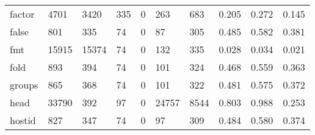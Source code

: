 \begin{longtable}{lp{1.3cm}p{1.3cm}p{1.3cm}p{1.3cm}p{1.3cm}p{1.3cm}p{1.3cm}p{1.3cm}p{1.3cm}}
factor    &                   4701 &                               3420 &                               335 &                                0 &                               263 &                             683 &                                   0.205 &                                  0.272 &                                0.145 \\
false     &                    801 &                                335 &                                74 &                                0 &                                87 &                             305 &                                   0.485 &                                  0.582 &                                0.381 \\
fmt       &                  15915 &                              15374 &                                74 &                                0 &                               132 &                             335 &                                   0.028 &                                  0.034 &                                0.021 \\
fold      &                    893 &                                394 &                                74 &                                0 &                               101 &                             324 &                                   0.468 &                                  0.559 &                                0.363 \\
groups    &                    865 &                                368 &                                74 &                                0 &                               101 &                             322 &                                   0.481 &                                  0.575 &                                0.372 \\
head      &                  33790 &                                392 &                                97 &                                0 &                             24757 &                            8544 &                                   0.803 &                                  0.988 &                                0.253 \\
hostid    &                    827 &                                347 &                                74 &                                0 &                                97 &                             309 &                                   0.484 &                                  0.580 &                                0.374 \\

\end{longtable}
